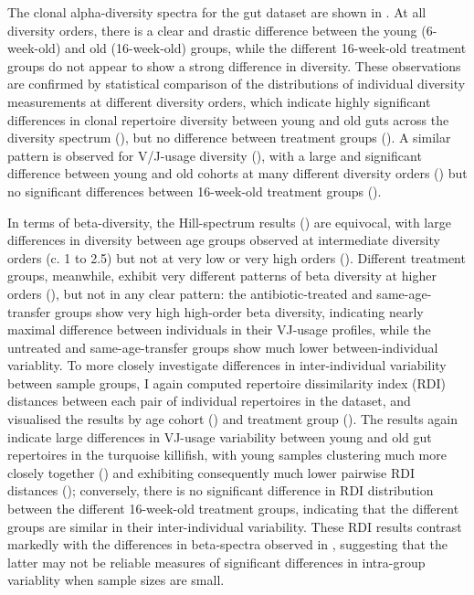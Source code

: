 
The clonal alpha-diversity spectra for the gut dataset are shown in . At all diversity orders, there is a clear and drastic difference between the young (6-week-old) and old (16-week-old) groups, while the different 16-week-old treatment groups do not appear to show a strong difference in diversity. These observations are confirmed by statistical comparison of the distributions of individual diversity measurements at different diversity orders, which indicate highly significant differences in clonal repertoire diversity between young and old guts across the diversity spectrum (), but no difference between treatment groups (). A similar pattern is observed for V/J-usage diversity (), with a large and significant difference between young and old cohorts at many different diversity orders () but no significant differences between 16-week-old treatment groups ().

In terms of beta-diversity, the Hill-spectrum results () are equivocal, with large differences in diversity between age groups observed at intermediate diversity orders (c. 1 to 2.5) but not at very low or very high orders (). Different treatment groups, meanwhile, exhibit very different patterns of beta diversity at higher orders (), but not in any clear pattern: the antibiotic-treated and same-age-transfer groups show very high high-order beta diversity, indicating nearly maximal difference between individuals in their VJ-usage profiles, while the untreated and same-age-transfer groups show much lower between-individual variablity. To more closely investigate differences in inter-individual variability between sample groups, I again computed repertoire dissimilarity index (RDI) distances between each pair of individual repertoires in the dataset, and visualised the results by age cohort () and treatment group (). The results again indicate large differences in VJ-usage variability between young and old gut repertoires in the turquoise killifish, with young samples clustering much more closely together () and exhibiting consequently much lower pairwise RDI distances (); conversely, there is no significant difference in RDI distribution between the different 16-week-old treatment groups, indicating that the different groups are similar in their inter-individual variability. These RDI results contrast markedly with the differences in beta-spectra observed in , suggesting that the latter may not be reliable measures of significant differences in intra-group variablity when sample sizes are small.

